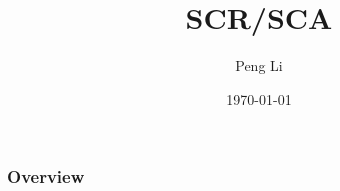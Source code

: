 \documentclass{beamer}
\title[P2P: SCR/SCA]{SCR/SCA} %
\author{Peng Li} %
\institute[CPVE] %
{
\\ %
\medskip
\textit{peli3@cisco.com} %
}
\date{\today} %
\begin{document}
\begin{frame}
\titlepage %
\end{frame}

\begin{frame}
\frametitle{Overview} %
\tableofcontents %
\end{frame}



\end{document}
